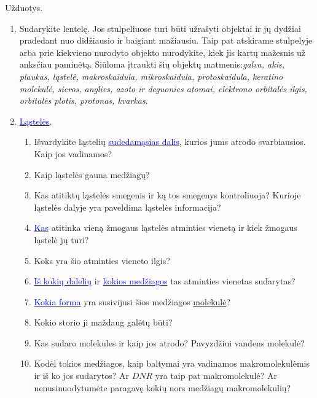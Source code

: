 \documentclass[a4paper]{article}
\begin{document}
Užduotys.
\begin{enumerate}
\item Sudarykite lentelę. Jos stulpeliuose turi būti užrašyti objektai ir jų dydžiai pradedant nuo didžiausio ir baigiant mažiausiu. Taip pat atskirame stulpelyje arba prie kiekvieno nurodyto objekto nurodykite, kiek jis kartų mažesnis už anksčiau paminėtą. Siūloma įtraukti šių objektų matmenis:\textit{galva, akis, plaukas, ląstelė, makroskaidula, mikroskaidula, protoskaidula, keratino molekulė, sieros, anglies, azoto ir deguonies atomai, elektrono orbitalės ilgis, orbitalės plotis, protonas, kvarkas}.
\item \href{\detokenize{https://lt.wikipedia.org/wiki/Ląstelė}}{\textcolor{blue}{Ląstelės}}. 
\begin{enumerate}
\item Išvardykite ląstelių \href{\detokenize{https://lt.wikipedia.org/wiki/Ląstelė#Prokariotų_ląstelių_struktūra}}{\textcolor{blue}{sudedamąsias dalis}}, kurios jums atrodo svarbiausios. Kaip jos vadinamos?
\item  Kaip ląstelės gauna medžiagų? 
\item Kas atitiktų ląstelės smegenis ir ką tos smegenys kontroliuoja? Kurioje ląstelės dalyje yra paveldima ląstelės informacija? 
\item \href{https://lt.wikipedia.org/wiki/Chromosoma}{\textcolor{blue}{Kas}} atitinka vieną žmogaus ląstelės atminties vienetą ir kiek žmogaus ląstelė jų turi? 
\item Koks yra šio atminties vieneto ilgis? 
\item \href{https://www.youtube.com/watch?v=V04jvRh5YFE}{\textcolor{blue}{Iš kokių dalelių}} ir \href{\detokenize{https://lt.wikipedia.org/wiki/Deoksiribonukleorūgštis}}{\textcolor{blue}{kokios medžiagos}} tas atminties vienetas sudarytas? 
\item \href{\detokenize{https://en.wikipedia.org/wiki/DNA}}{\textcolor{blue}{Kokia forma}} yra susivijusi šios medžiagos \href{\detokenize{https://lt.wikipedia.org/wiki/Molekulė}}{molekulė}? 
\item Kokio storio ji maždaug galėtų būti? 
\item Kas sudaro molekules ir kaip jos atrodo? Pavyzdžiui vandens molekulė? 
\item Kodėl tokios medžiagos, kaip baltymai yra vadinamos makromolekulėmis ir iš ko jos sudarytos? Ar $DNR$ yra taip pat makromolekulė? Ar nenusinuodytumėte paragavę kokių nors medžiagų makromolekulių?
\end{enumerate}

\end{enumerate}
\end{document}

